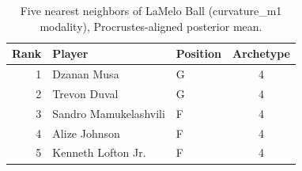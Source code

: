 \begin{table}[htbp]
  \centering\small
  \begin{tabular}{rllc}
    \toprule
    Rank & Player & Position & Archetype \\
    \midrule
    1 & Dzanan Musa & G & 4 \\
    2 & Trevon Duval & G & 4 \\
    3 & Sandro Mamukelashvili & F & 4 \\
    4 & Alize Johnson & F & 4 \\
    5 & Kenneth Lofton Jr. & F & 4 \\
    \bottomrule
  \end{tabular}
  \caption{Five nearest neighbors of LaMelo Ball (curvature_m1 modality), Procrustes-aligned posterior mean.}
  \label{tab:LaMelo_Ball_neighbors_curvature_m1}
\end{table}


